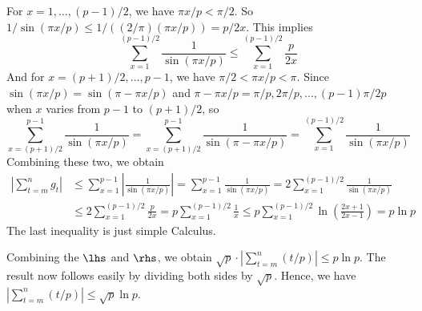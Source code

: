 \documentclass[../Chapter.tex]{subfiles}
\begin{document}
For $x=1,\ldots,(p-1)/2$, we have $\pi x/p<\pi/2$. So $1/\sin(\pi x/p)\leq1/((2/\pi)(\pi x/p))=p/2x$. This implies $$\sum_{x=1}^{(p-1)/2} \frac{1}{\sin(\pi x/p)} \leq \sum_{x=1}^{(p-1)/2} \frac{p}{2x}$$
And for $x=(p+1)/2,\ldots,p-1$, we have $\pi/2<\pi x/p<\pi$. Since $\sin(\pi x/p)=\sin(\pi-\pi x/p)$ and $\pi-\pi x/p=\pi/p,2\pi/p,\ldots,(p-1)\pi/2p$ when $x$ varies from $p-1$ to $(p+1)/2$, so $$\sum_{x=(p+1)/2}^{p-1} \frac{1}{\sin(\pi x/p)}=\sum_{x=(p+1)/2}^{p-1} \frac{1}{\sin(\pi-\pi x/p)} = \sum_{x=1}^{(p-1)/2} \frac{1}{\sin(\pi x/p)}$$
Combining these two, we obtain
\begin{align*}
\left|\sum_{t=m}^n g_t\right| &\leq \sum_{x=1}^{p-1} \left|\frac{1}{\sin(\pi x/p)}\right| = \sum_{x=1}^{p-1} \frac{1}{\sin(\pi x/p)} = 2\sum_{x=1}^{(p-1)/2} \frac{1}{\sin(\pi x/p)} \\
&\leq 2\sum_{x=1}^{(p-1)/2} \frac{p}{2x} = p\sum_{x=1}^{(p-1)/2} \frac{1}{x} \leq p\sum_{x=1}^{(p-1)/2} \ln\left(\frac{2x+1}{2x-1}\right) = p\ln p
\end{align*}
The last inequality is just simple Calculus.

Combining the $\lhs$ and $\rhs$, we obtain $\sqrt{p}\cdot|\sum_{t=m}^n (t/p)|\leq p\ln p$. The result now follows easily by dividing both sides by $\sqrt{p}$. Hence, we have $|\sum_{t=m}^n (t/p)|\leq \sqrt{p}\ln p$.
\end{document}
